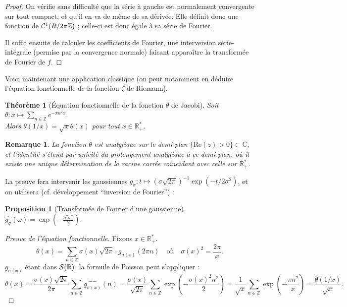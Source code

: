 \documentclass[a4paper, 11pt]{article}
\def\Z{\mathbb{Z}}
\def\R{\mathbb{R}}
\def\C{\mathbb{C}}
\def\S{{\cal{S}}}
\def\Cf{{\cal{C}}}
\newtheorem*{proposition}{Proposition}
\newtheorem*{theorem}{Théorème}
\newtheorem*{remark}{Remarque}
\begin{document}
\begin{proof}
  On vérifie sans difficulté que la série à gauche est normalement convergente
  sur tout compact, et qu'il en va de même de sa dérivée. Elle définit donc une
  fonction de $\Cf^1(R/2\pi\Z)$ ; celle-ci est donc égale à sa série de Fourier.

  Il suffit ensuite de calculer les coefficients de Fourier, une interversion
  série-intégrale (permise par la convergence normale) faisant apparaître la
  transformée de Fourier de $f$.
\end{proof}

Voici maintenant une application classique (on peut notamment en déduire
l'équation fonctionnelle de la fonction $\zeta$ de Riemann).

\begin{theorem}[Équation fonctionnelle de la fonction $\theta$ de Jacobi]
  Soit $\theta : x \mapsto \sum_{n \in \Z} e^{-\pi n^2 x}$.\\
  Alors $\theta(1/x) = \sqrt{x}\theta(x)$ pour tout $x \in \R_+^*$.
\end{theorem}
\begin{remark}
  La fonction $\theta$ est analytique sur le demi-plan $\{\mathrm{Re}(z) > 0\}
  \subset \C$, et l'identité s'étend par unicité du prolongement analytique à ce
  demi-plan, où il existe une unique détermination de la racine carrée
  coïncidant avec celle sur $\R^*_+$.
\end{remark}

La preuve fera intervenir les gaussiennes $g_\sigma : t \mapsto
(\sigma\sqrt{2\pi})^{-1} \exp(-t/2\sigma^2)$, et on utilisera (cf. développement
\enquote{inversion de Fourier}) :
\begin{proposition}[Transformée de Fourier d'une gaussienne]
  $\displaystyle \widehat{g_\sigma}(\omega) = \exp\left(- \frac{\sigma^2
      \omega^2}{2} \right)$. %
\end{proposition}

\begin{proof}[Preuve de l'équation fonctionnelle]
  Fixons $x \in \R_+^*$.
  \[ \theta(x) = \sum_{n \in \Z} \sigma(x)\sqrt{2\pi}
    \cdot g_{\sigma(x)}(2\pi n) \quad \text{où} \quad
    \sigma(x)^2 = \frac{2\pi}{x}.
  \]
  $g_{\sigma(x)}$ étant dans $\S(\R)$, la formule de Poisson peut s'appliquer :
  \[ \theta(x) =
    \frac{\sigma(x)\sqrt{2\pi}}{2\pi} \sum_{n \in \Z}
    \widehat{g_{\sigma(x)}}(n) =
    \frac{\sigma(x)}{\sqrt{2\pi}} \sum_{n \in \Z}
    \exp\left(-\frac{\sigma(x)^2 n^2}{2} \right) =
    \frac{1}{\sqrt{x}} \sum_{n \in \Z} \exp\left( -\frac{\pi n^2}{x} \right)
    = \frac{\theta(1/x)}{\sqrt{x}}.
  \]
\end{proof}
\end{document}

